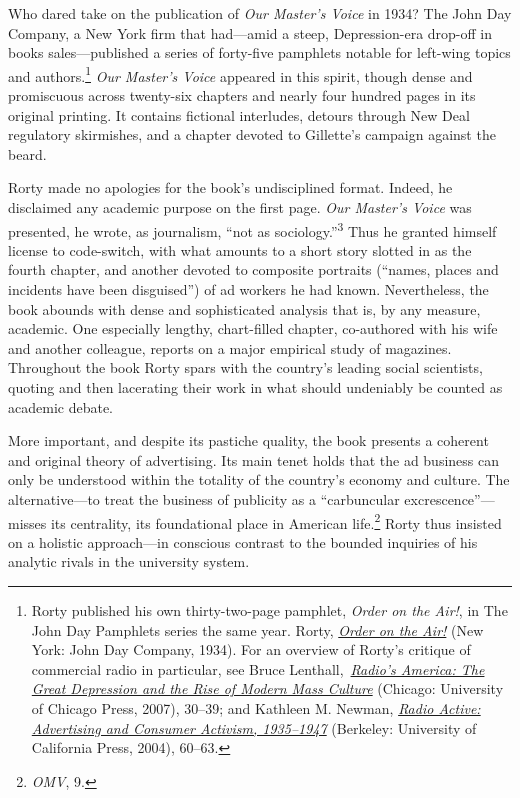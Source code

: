 \documentclass[openany,nobib]{tufte-book}
\begin{document}
Who dared take on the publication of \emph{Our Master's Voice} in 1934?
The John Day Company, a New York firm that had---amid a steep,
Depression-era drop-off in books sales---published a series of
forty-five pamphlets notable for left-wing topics and authors.\footnote{Rorty published his own thirty-two-page pamphlet, \emph{Order on the
  Air!}, in The John Day Pamphlets series the same year. Rorty,
  \emph{\href{https://books.google.com/books/about/Order_on_the_Air.html?id=2vBCAAAAIAAJ}{Order
  on the Air!}} (New York: John Day Company, 1934). For an overview of
  Rorty's critique of commercial radio in particular, see Bruce
  Lenthall,~\emph{\href{http://www.worldcat.org/oclc/84838887}{Radio's
  America: The Great Depression and the Rise of Modern Mass Culture}}
  (Chicago: University of Chicago Press, 2007), 30--39; and Kathleen M.
  Newman, \emph{\href{http://www.worldcat.org/oclc/473847893}{Radio
  Active: Advertising and Consumer Activism, 1935--1947}} (Berkeley:
  University of California Press, 2004), 60--63.}
\emph{Our Master's Voice} appeared in this spirit, though dense and
promiscuous across twenty-six chapters and nearly four hundred pages in
its original printing. It contains fictional interludes, detours through
New Deal regulatory skirmishes, and a chapter devoted to Gillette's
campaign against the beard.

Rorty made no apologies for the book's undisciplined format. Indeed, he
disclaimed any academic purpose on the first page. \emph{Our Master's
Voice} was presented, he wrote, as journalism, ``not as sociology.''\textsuperscript{3}
Thus he granted himself license to code-switch, with what amounts to a
short story slotted in as the fourth chapter, and another devoted \setcounter{footnote}{3}to
composite portraits (``names, places and incidents have been
disguised'') of ad workers he had known. Nevertheless, the book abounds
with dense and sophisticated analysis that is, by any measure, academic.
One especially lengthy, chart-filled chapter, co-authored with his wife
and another colleague, reports on a major empirical study of magazines.
Throughout the book Rorty spars with the country's leading social
scientists, quoting and then lacerating their work in what should
undeniably be counted as academic debate.

More important, and despite its pastiche quality, the book presents a
coherent and original theory of advertising. Its main tenet holds that
the ad business can only be understood within the totality of the
country's economy and culture. The alternative---to treat the business
of publicity as a ``carbuncular excrescence''---misses its centrality,
its foundational place in American life.\footnote{\emph{OMV}, 9.} Rorty thus insisted on a
holistic approach---in conscious contrast to the bounded inquiries of
his analytic rivals in the university system.
\end{document}
